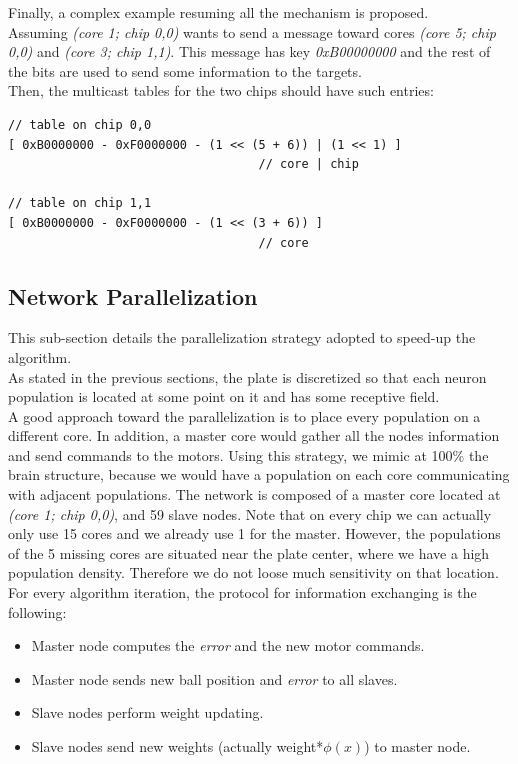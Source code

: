 \documentclass{article}
\begin{document}
Finally, a complex example resuming all the mechanism is proposed.\\
Assuming \textit{(core 1; chip 0,0)} wants to send a message toward cores \textit{(core 5; chip 0,0)} and \textit{(core 3; chip 1,1)}. This message has key \textit{0xB00000000} and the rest of the bits are used to send some information to the targets.\\
Then, the multicast tables for the two chips should have such entries:
\begin{verbatim}
// table on chip 0,0
[ 0xB0000000 - 0xF0000000 - (1 << (5 + 6)) | (1 << 1) ]
                                   // core | chip
								
// table on chip 1,1
[ 0xB0000000 - 0xF0000000 - (1 << (3 + 6)) ]
                                   // core
\end{verbatim}


\subsection{Network Parallelization}
This sub-section details the parallelization strategy adopted to speed-up the algorithm. \\

As stated in the previous sections, the plate is discretized so that each neuron population is located at some point on it and has some receptive field.\\
A good approach toward the parallelization is to place every population on a different core. In addition, a master core would gather all the nodes information and send commands to the motors. Using this strategy, we mimic at 100\% the brain structure, because we would have a population on each core communicating with adjacent populations. The network is composed of a master core located at \textit{(core 1; chip 0,0)}, and 59 slave nodes. Note that on every chip we can actually only use 15 cores and we already use 1 for the master. However, the populations of the 5 missing cores are situated near the plate center, where we have a high population density. Therefore we do not loose much sensitivity on that location.\\
For every algorithm iteration, the protocol for information exchanging  is the following:

\begin{itemize}
\item Master node computes the \textit{error} and the new motor commands.
\item Master node sends new ball position and \textit{error} to all slaves.
\item Slave nodes perform weight updating.
\item Slave nodes send new weights (actually weight*\(\phi(x)\)) to master node.
\end{itemize}
\end{document}
